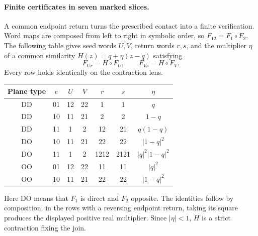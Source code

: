 \paragraph{Finite certificates in seven marked slices.}
A common endpoint return turns the prescribed contact into a finite
verification. Word maps are composed from left to right in symbolic order,
so $F_{12}=F_1\circ F_2$. The following table gives seed words $U,V$,
return words $r,s$, and the multiplier $\eta$ of a common similarity
$H(z)=q+\eta(z-q)$ satisfying
\begin{equation}\label{eq:zipper-return-identities}
 F_{Ur}=H\circ F_U,\qquad F_{Vs}=H\circ F_V.
\end{equation}
Every row holds identically on the contraction lens.
\begin{center}
\begin{tabular}{cc|cc|cc|c}
Plane type&$e$&$U$&$V$&$r$&$s$&$\eta$\\\hline
DD&01&12&22&1&1&$q$\\
DD&10&11&21&2&2&$1-q$\\
DD&11&1&2&12&21&$q(1-q)$\\
DO&10&11&21&22&22&$|1-q|^2$\\
DO&11&1&2&1212&2121&$|q|^2|1-q|^2$\\
OO&01&12&22&11&11&$|q|^2$\\
OO&10&11&21&22&22&$|1-q|^2$
\end{tabular}
\end{center}
Here DO means that $F_1$ is direct and $F_2$ opposite. The identities follow
by composition; in the rows with a reversing endpoint return, taking its
square produces the displayed positive real multiplier. Since $|\eta|<1$,
$H$ is a strict contraction fixing the join.

